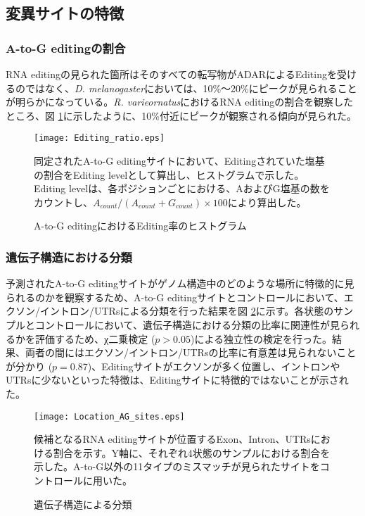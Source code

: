 \subsection{変異サイトの特徴}
\subsubsection{A-to-G editingの割合}
RNA editingの見られた箇所はそのすべての転写物がADARによるEditingを受けるのではなく、{\it D. melanogaster}においては、10\%〜20\%にピークが見られることが明らかになっている。{\it R. varieornatus}におけるRNA editingの割合を観察したところ、図 \ref{fig:freq}に示したように、10\%付近にピークが観察される傾向が見られた。

\begin{figure}[!h]
	\centering
	\texttt{[image: Editing\_ratio.eps]}
	\caption{A-to-G editingにおけるEditing率のヒストグラム}
	\begin{flushleft}
		\small{同定されたA-to-G editingサイトにおいて、Editingされていた塩基の割合をEditing levelとして算出し、ヒストグラムで示した。Editing levelは、各ポジションごとにおける、AおよびG塩基の数をカウントし、$A_{count}/(A_{count}+G_{count}) \times100$により算出した。}
	\end{flushleft}
	\label{fig:freq}
\end{figure}

\subsubsection{遺伝子構造における分類}
予測されたA-to-G editingサイトがゲノム構造中のどのような場所に特徴的に見られるのかを観察するため、A-to-G editingサイトとコントロールにおいて、エクソン/イントロン/UTRsによる分類を行った結果を図 \ref{fig:location}に示す。各状態のサンプルとコントロールにおいて、遺伝子構造における分類の比率に関連性が見られるかを評価するため、χ二乗検定 ($p>0.05$)による独立性の検定を行った。結果、両者の間にはエクソン/イントロン/UTRsの比率に有意差は見られないことが分かり ($p=0.87$)、Editingサイトがエクソンが多く位置し、イントロンやUTRsに少ないといった特徴は、Editingサイトに特徴的ではないことが示された。
			
\begin{figure}[!h]
	\centering
	\texttt{[image: Location\_AG\_sites.eps]}
	\caption{遺伝子構造による分類}
	\begin{flushleft}
		\small{候補となるRNA editingサイトが位置するExon、Intron、UTRsにおける割合を示す。Y軸に、それぞれ4状態のサンプルにおける割合を示した。A-to-G以外の11タイプのミスマッチが見られたサイトをコントロールに用いた。}
	\end{flushleft}
	\label{fig:location}
\end{figure}

